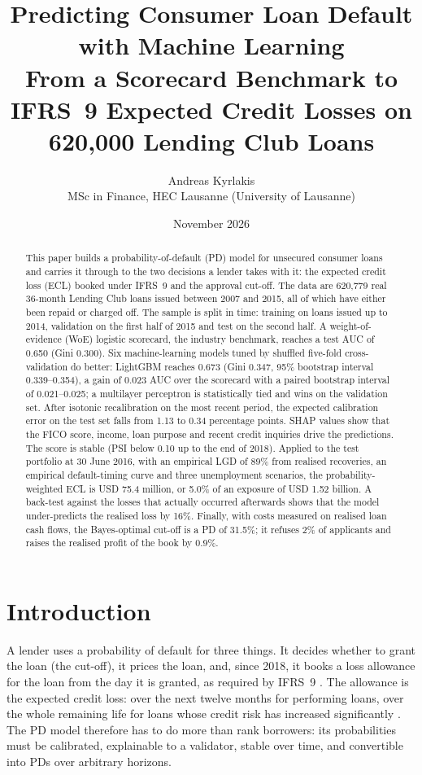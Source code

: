 \documentclass[11pt,a4paper]{article}
\title{Predicting Consumer Loan Default with Machine Learning\\
\large From a Scorecard Benchmark to IFRS~9 Expected Credit Losses on 620{,}000 Lending Club Loans}
\author{Andreas Kyrlakis\\
\small MSc in Finance, HEC Lausanne (University of Lausanne)}
\date{November 2026}
\begin{document}
\maketitle

\begin{abstract}
\noindent
This paper builds a probability-of-default (PD) model for unsecured consumer loans and carries it through to the two decisions a lender takes with it: the expected credit loss (ECL) booked under IFRS~9 and the approval cut-off. The data are 620{,}779 real 36-month Lending Club loans issued between 2007 and 2015, all of which have either been repaid or charged off. The sample is split in time: training on loans issued up to 2014, validation on the first half of 2015 and test on the second half. A weight-of-evidence (WoE) logistic scorecard, the industry benchmark, reaches a test AUC of 0.650 (Gini 0.300). Six machine-learning models tuned by shuffled five-fold cross-validation do better: LightGBM reaches 0.673 (Gini 0.347, 95\% bootstrap interval 0.339--0.354), a gain of 0.023 AUC over the scorecard with a paired bootstrap interval of 0.021--0.025; a multilayer perceptron is statistically tied and wins on the validation set. After isotonic recalibration on the most recent period, the expected calibration error on the test set falls from 1.13 to 0.34 percentage points. SHAP values show that the FICO score, income, loan purpose and recent credit inquiries drive the predictions. The score is stable (PSI below 0.10 up to the end of 2018). Applied to the test portfolio at 30 June 2016, with an empirical LGD of 89\% from realised recoveries, an empirical default-timing curve and three unemployment scenarios, the probability-weighted ECL is USD 75.4 million, or 5.0\% of an exposure of USD 1.52 billion. A back-test against the losses that actually occurred afterwards shows that the model under-predicts the realised loss by 16\%. Finally, with costs measured on realised loan cash flows, the Bayes-optimal cut-off is a PD of 31.5\%; it refuses 2\% of applicants and raises the realised profit of the book by 0.9\%.
\end{abstract}

\section{Introduction}

A lender uses a probability of default for three things. It decides whether to grant the loan (the cut-off), it prices the loan, and, since 2018, it books a loss allowance for the loan from the day it is granted, as required by IFRS~9 \citep{ifrs9}. The allowance is the expected credit loss: over the next twelve months for performing loans, over the whole remaining life for loans whose credit risk has increased significantly \citep{bcbs2015}. The PD model therefore has to do more than rank borrowers: its probabilities must be calibrated, explainable to a validator, stable over time, and convertible into PDs over arbitrary horizons.
\end{document}
